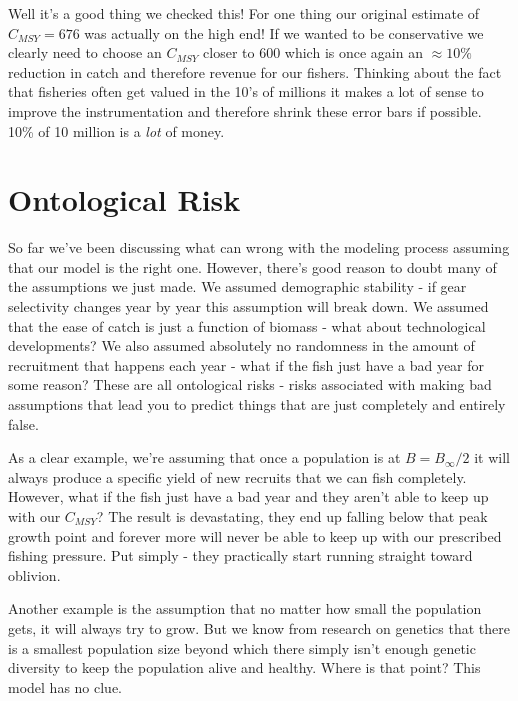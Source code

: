 \documentclass[11pt,a5paper]{book}
\begin{document}
Well it's a good thing we checked this! For one thing our original estimate of $C_{MSY}=676$ was actually on the high end! If we wanted to be conservative we clearly need to choose an $C_{MSY}$ closer to 600 which is once again an $\approx 10\%$ reduction in catch and therefore revenue for our fishers. Thinking about the fact that fisheries often get valued in the 10's of millions it makes a lot of sense to improve the instrumentation and therefore shrink these error bars if possible. 10\% of 10 million is a \textit{lot} of money. 
\newline

\section{Ontological Risk}

So far we've been discussing what can wrong with the modeling process assuming that our model is the right one. However, there's good reason to doubt many of the assumptions we just made. We assumed demographic stability - if gear selectivity changes year by year this assumption will break down. We assumed that the ease of catch is just a function of biomass - what about technological developments? We also assumed absolutely no randomness in the amount of recruitment that happens each year - what if the fish just have a bad year for some reason? These are all ontological risks - risks associated with making bad assumptions that lead you to predict things that are just completely and entirely false. 
\newline

As a clear example, we're assuming that once a population is at $B=B_\infty / 2$ it will always produce a specific yield of new recruits that we can fish completely. However, what if the fish just have a bad year and they aren't able to keep up with our $C_{MSY}$? The result is devastating, they end up falling below that peak growth point and forever more will never be able to keep up with our prescribed fishing pressure. Put simply - they practically start running straight toward oblivion. 
\newline

Another example is the assumption that no matter how small the population gets, it will always try to grow. But we know from research on genetics that there is a smallest population size beyond which there simply isn't enough genetic diversity to keep the population alive and healthy. Where is that point? This model has no clue. 
\newline
\end{document}
